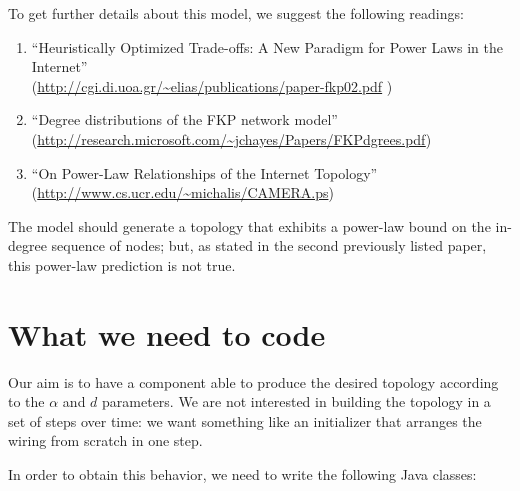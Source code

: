 \documentclass[a4paper,12pt]{article}
\begin{document}
To get further details about this model, we suggest the following
readings:

\begin{enumerate}

\item ``Heuristically Optimized Trade-offs: A New Paradigm for Power
Laws in the Internet'' \\
(\url{http://cgi.di.uoa.gr/~elias/publications/paper-fkp02.pdf} )

\item  ``Degree distributions
of the FKP network model'' \\
(\url{http://research.microsoft.com/~jchayes/Papers/FKPdgrees.pdf}) 

\item ``On Power-Law
Relationships of the Internet Topology''\\
(\url{http://www.cs.ucr.edu/~michalis/CAMERA.ps})

\end{enumerate}

The model should generate a topology that exhibits a power-law bound
on the in-degree sequence of nodes; but, as stated in the second
previously listed paper, this power-law prediction is not true.

\section{What we need to code}

Our aim is to have a component able to produce the desired topology
according to the $\alpha$ and $d$ parameters. We are not interested
in building the topology in a set of steps over time: we want
something like an initializer that arranges the wiring from scratch in
one step.

In order to obtain this behavior, we need to write the following
Java classes:  
\end{document}
